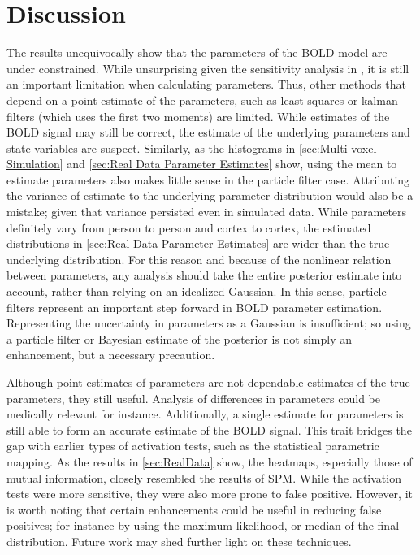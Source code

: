 \chapter{Discussion}
The results unequivocally show that the parameters of the BOLD model are under
constrained. While unsurprising given the sensitivity analysis in \cite{Deneux2006},
it is still an important limitation when calculating parameters. Thus, other methods
that depend on a point estimate of the parameters, such as least squares 
or kalman filters (which uses the first two moments) are limited. While estimates of
the  BOLD signal may still be correct, the estimate
of the underlying parameters and state variables are suspect. Similarly, as the
histograms in \autoref{sec:Multi-voxel Simulation} and \autoref{sec:Real Data Parameter Estimates}
show, using the mean to estimate parameters also makes little sense in the particle filter
case. Attributing the variance of estimate to the underlying parameter distribution would
also be a mistake; given that variance persisted even in simulated data. While parameters 
definitely vary from person to person and cortex to cortex, the estimated distributions 
in \autoref{sec:Real Data Parameter Estimates} are wider than the true underlying 
distribution. For this reason and because of the nonlinear relation between
parameters, any analysis should take the entire posterior estimate into account, 
rather than relying on an idealized Gaussian. In this sense, particle filters represent
an important step forward in BOLD parameter estimation. Representing
the uncertainty in parameters as a Gaussian is insufficient; so using a particle filter
or Bayesian estimate of the posterior is not simply an enhancement, but a necessary precaution.

Although point estimates of parameters are not dependable estimates of the 
true parameters, they still useful. Analysis of differences in parameters
could be medically relevant for instance. Additionally, a single estimate for parameters is still able
to form an accurate estimate of the BOLD signal. This trait bridges the gap with earlier types 
of activation tests, such as the statistical
parametric mapping. As the results in \autoref{sec:RealData} show, the heatmaps, especially
those of mutual information, closely resembled the results of SPM. While the activation
tests were more sensitive, they were also more prone to false positive. However, it is
worth noting that certain enhancements could be useful in reducing false positives; for instance
by using the maximum likelihood, or median of the final distribution.  Future work may 
shed further light on these techniques. 


